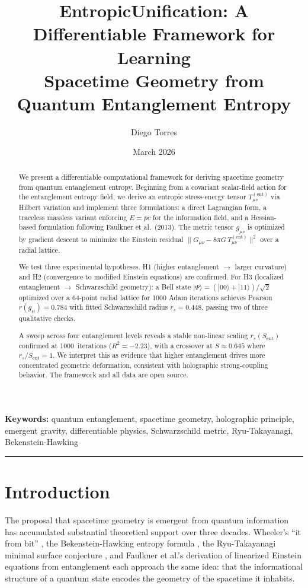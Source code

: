 \documentclass[12pt,a4paper]{article}
\title{
  \textbf{EntropicUnification: A Differentiable Framework for Learning\\
  Spacetime Geometry from Quantum Entanglement Entropy}
}
\author[1]{Diego Torres}
\affil[1]{Organica AI Solutions, Philadelphia, PA\\
  \texttt{\href{https://organicaai.com}{organicaai.com}} \quad
  \texttt{\href{https://github.com/Organica-Ai-Solutions/EntropicUnification}{%
    github.com/Organica-Ai-Solutions/EntropicUnification}}
}
\date{March 2026}
\newcommand{\Sent}{S_{\mathrm{ent}}}
\newcommand{\Tent}{T^{(\mathrm{ent})}_{\mu\nu}}
\newcommand{\rs}{r_s}
\newcommand{\Gmn}{G_{\mu\nu}}
\newcommand{\gmn}{g_{\mu\nu}}
\begin{document}
\maketitle

\begin{abstract}
We present a differentiable computational framework for deriving spacetime
geometry from quantum entanglement entropy.
Beginning from a covariant scalar-field action for the entanglement entropy
field, we derive an entropic stress-energy tensor $\Tent$ via Hilbert
variation and implement three formulations: a direct Lagrangian form, a
traceless massless variant enforcing $E=pc$ for the information field, and a
Hessian-based formulation following Faulkner et al.\ (2013).
The metric tensor $\gmn$ is optimized by gradient descent to minimize the
Einstein residual $\|\Gmn - 8\pi G\,\Tent\|^2$ over a radial lattice.

We test three experimental hypotheses. H1 (higher entanglement $\to$ larger
curvature) and H2 (convergence to modified Einstein equations) are confirmed.
For H3 (localized entanglement $\to$ Schwarzschild geometry): a Bell state
$|\Psi\rangle=(|00\rangle+|11\rangle)/\sqrt{2}$ optimized over a 64-point
radial lattice for 1000 Adam iterations achieves Pearson
$r(g_{tt})=0.784$ with fitted Schwarzschild radius $\rs=0.448$,
passing two of three qualitative checks.

A sweep across four entanglement levels reveals a stable non-linear scaling
$\rs(\Sent)$ confirmed at 1000~iterations ($R^2=-2.23$), with a crossover at
$S\approx 0.645$ where $\rs/\Sent=1$. We interpret this as evidence that
higher entanglement drives more concentrated geometric deformation, consistent
with holographic strong-coupling behavior. The framework and all data are
open source.
\end{abstract}

\textbf{Keywords:} quantum entanglement, spacetime geometry, holographic
principle, emergent gravity, differentiable physics, Schwarzschild metric,
Ryu-Takayanagi, Bekenstein-Hawking

\bigskip
\hrule
\bigskip

\section{Introduction}

The proposal that spacetime geometry is emergent from quantum information has
accumulated substantial theoretical support over three decades.
Wheeler's ``it from bit'' \cite{wheeler1990}, the Bekenstein-Hawking entropy
formula \cite{bekenstein1973,hawking1975}, the Ryu-Takayanagi minimal surface
conjecture \cite{ryu2006}, and Faulkner et al.'s derivation of linearized
Einstein equations from entanglement \cite{faulkner2014} each approach the
same idea: that the informational structure of a quantum state encodes the
geometry of the spacetime it inhabits.
\end{document}
